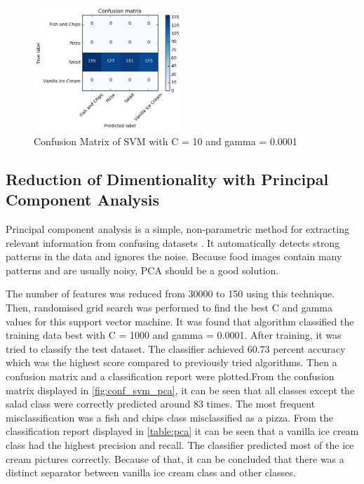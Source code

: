 \begin{figure}[h]
\centering
\includegraphics[width=0.5\textwidth]{Figures/svm2.png}
\caption{Confusion Matrix of SVM with C = 10 and gamma = 0.0001}
\label{fig:svd}
\end{figure}


\subsection{Reduction of  Dimentionality with Principal Component Analysis}
Principal component analysis is a simple, non-parametric method for extracting relevant information from confusing datasets \citep{pca}. It automatically detects strong patterns in the data and ignores the noise. Because food images contain many patterns and are usually noisy, PCA should be a good solution.  

The number of features was reduced from 30000 to 150 using this technique. Then, randomised grid search was performed to find the best C and gamma values for this support vector machine. 
It was found that algorithm classified the training data best with C = 1000 and gamma = 0.0001. After training, it was tried to classify the test dataset. The classifier achieved 60.73 percent accuracy which was the highest score compared to previously tried algorithms. Then a  confusion matrix and a classification report were plotted.From the confusion matrix displayed in \autoref{fig:conf_svm_pca}, it can be seen that all classes except the salad class were correctly predicted around 83 times. The most frequent misclassification was a fish and chips class misclassified as a pizza. From the classification report displayed in    \autoref{table:pca} it can be seen that a vanilla ice cream class had the highest precision and recall. The classifier predicted most of the ice cream pictures correctly. Because of that, it can be concluded that there was a distinct separator between vanilla ice cream class and other classes.

